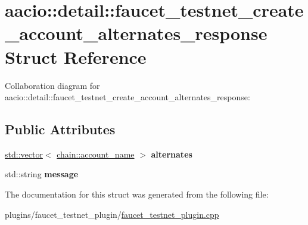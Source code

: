 \hypertarget{structaacio_1_1detail_1_1faucet__testnet__create__account__alternates__response}{}\section{aacio\+:\+:detail\+:\+:faucet\+\_\+testnet\+\_\+create\+\_\+account\+\_\+alternates\+\_\+response Struct Reference}
\label{structaacio_1_1detail_1_1faucet__testnet__create__account__alternates__response}


Collaboration diagram for aacio\+:\+:detail\+:\+:faucet\+\_\+testnet\+\_\+create\+\_\+account\+\_\+alternates\+\_\+response\+:
\subsection*{Public Attributes}
\begin{DoxyCompactItemize}
\item 
\mbox{\label{structaacio_1_1detail_1_1faucet__testnet__create__account__alternates__response_a3d61a356242fd29b67265f6ddd78c9b4}} 
\mbox{\hyperlink{classstd_1_1vector}{std\+::vector}}$<$ \mbox{\hyperlink{structaacio_1_1chain_1_1name}{chain\+::account\+\_\+name}} $>$ {\bfseries alternates}
\item 
\mbox{\label{structaacio_1_1detail_1_1faucet__testnet__create__account__alternates__response_a0138064cfc1ab4c143149f0f5f5943b0}} 
std\+::string {\bfseries message}
\end{DoxyCompactItemize}


The documentation for this struct was generated from the following file\+:\begin{DoxyCompactItemize}
\item 
plugins/faucet\+\_\+testnet\+\_\+plugin/\mbox{\hyperlink{faucet__testnet__plugin_8cpp}{faucet\+\_\+testnet\+\_\+plugin.\+cpp}}\end{DoxyCompactItemize}
